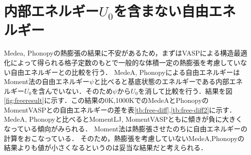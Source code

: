 \section{内部エネルギー$U_0$を含まない自由エネルギー}
Medea, Phonopyの熱膨張の結果に不安があるため，まずはVASPによる構造最適化によって得られる格子定数のもとで一般的な体積一定の熱膨張を考慮していない自由エネルギーとの比較を行う．
MedeA, Phonopyによる自由エネルギーはMoment法の自由エネルギー$\psi$と比べると基底状態のエネルギーである内部エネルギー$U_0$を含んでいない．そのため$\psi$から$U_0$を消して比較を行う．結果を図\ref{fig:freeresult}に示す．この結果の0K,1000KでのMedeAとPhonopyのMomentVASPとの自由エネルギーの差を表\ref{tb:free-diff},\ref{tb:free-diff2}に示す．
MedeA, Phonopyと比べるとMomentLJ, MomentVASPともに傾きが負に大きくなっている傾向がみられる．
Moment法は熱膨張させたのちに自由エネルギーの計算をおこなっている．
そのため，熱膨張を考慮していないMedeA,Phonopyの結果よりも値が小さくなるというのは妥当な結果だと考えられる．

